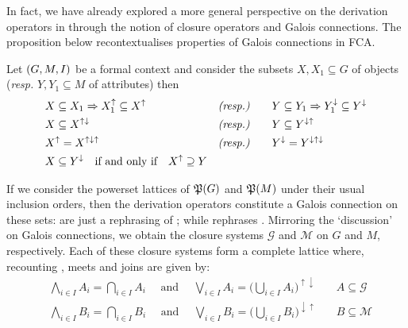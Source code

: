 In fact, we have already explored a more general perspective on the derivation operators in  through the
notion of closure operators and Galois connections. The proposition below recontextualises properties of Galois connections in FCA.

\begin{proposition}
  \label{proposition:derivation-operators-galois} Let $(G,M,\mathrel{I})$ be a formal context and consider the subsets $X,X_{1}\subseteq G$ of objects (\textit{resp.}
  $Y,Y_{1}\subseteq M$ of attributes) then
  \begin{align}
     & X \subseteq X_{1}\Rightarrow X_{1}^{\uparrow}\subseteq X^{\uparrow} & \textit{(resp.)}         & \qquad Y \subseteq Y_{1}\Rightarrow Y_{1}^{\downarrow}\subseteq Y^{\downarrow}\label{equation:galois-1} \\
     & X \subseteq X^{\uparrow \downarrow}                                 & \textit{(resp.)}         & \qquad Y \subseteq Y^{\downarrow \uparrow}\label{equation:galois-2}                                     \\
     & X^{\uparrow}= X^{\uparrow \downarrow \uparrow}                      & \textit{(resp.)}         & \qquad Y^{\downarrow}= Y^{\downarrow \uparrow \downarrow}\label{equation:galois-3}                      \\
     & X \subseteq Y^{\downarrow}\quad \text{if and only if}\quad X^{\uparrow}\supseteq Y             & \label{equation:galois-4}
  \end{align}
\end{proposition}

If we consider the powerset lattices of $\mathfrak{P}({G})$ and $\mathfrak{P}({M})$ under their usual inclusion orders, then the derivation operators constitute
a Galois connection on these sets:  are just a rephrasing of
; while  rephrases .
Mirroring the `discussion' on Galois connections, we obtain the closure systems $\mathcal{G}$ and $\mathcal{M}$ on $G$ and $M$, respectively.
Each of these closure systems form a complete lattice where, recounting , meets and joins are given by:
%
\begin{align*}
   & \underset{i \in I}\bigwedge A_{i}= \underset{i \in I}\bigcap A_{i}\quad \text{ and }\quad \underset{i \in I}\bigvee A_{i}= \big(\underset{i \in I}\bigcup A_{i}\big)^{\uparrow \downarrow} & \quad A\subseteq \mathcal{G} \\
   & \underset{i \in I}\bigwedge B_{i}= \underset{i \in I}\bigcap B_{i}\quad \text{ and }\quad\underset{i \in I}\bigvee B_{i}= \big( \underset{i \in I}\bigcup B_{i}\big)^{\downarrow \uparrow} & \quad B\subseteq \mathcal{M}
\end{align*}

